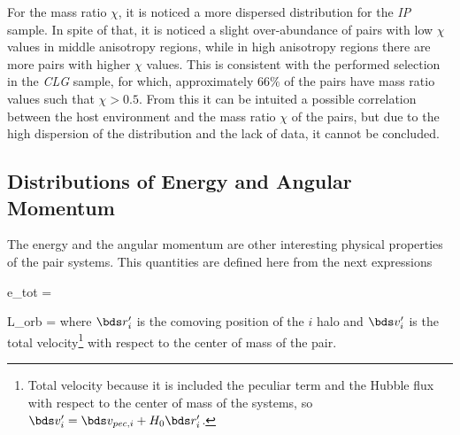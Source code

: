 For the mass ratio $\chi$, it is noticed a more dispersed distribution for
the \textit{IP} sample. In spite of that, it is noticed a slight 
over-abundance of pairs with low $\chi$ values in middle anisotropy 
regions, while in high anisotropy regions there are more pairs with 
higher $\chi$ values. This is consistent with the performed selection in
the \textit{CLG} sample, for which, approximately $66\%$ of the pairs
have mass ratio values such that $\chi>0.5$. From this it can be intuited
a possible correlation between the host environment and the mass ratio 
$\chi$ of the pairs, but due to the high dispersion of the distribution
and the lack of data, it cannot be concluded.


\newpage

	\subsection{Distributions of Energy and Angular Momentum}
	\label{subsec:AngularMomentumAndEnergy}


The energy and the angular momentum are other interesting physical 
properties of the pair systems. This quantities are defined here from the
next expressions



{ e_{tot} = 
 }


{ \bds L_{orb} = }
where $\bds r_i'$ is the comoving position of the $i$ halo and $\bds v_i'$
is the total velocity\footnote{ Total velocity because it is included the
peculiar term and the Hubble flux with respect to the center of mass of
the systems, so $\bds v_i' = \bds v_{pec,i} + H_0 \bds r_i'$.} with 
respect to the center of mass of the pair.



